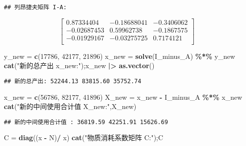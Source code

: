 \documentclass[
]{article}
\newenvironment{Shaded}{\begin{snugshade}}{\end{snugshade}}
\newcommand{\DecValTok}[1]{\textcolor[rgb]{0.00,0.00,0.81}{#1}}
\newcommand{\FunctionTok}[1]{\textcolor[rgb]{0.13,0.29,0.53}{\textbf{#1}}}
\newcommand{\NormalTok}[1]{#1}
\newcommand{\OtherTok}[1]{\textcolor[rgb]{0.56,0.35,0.01}{#1}}
\newcommand{\SpecialCharTok}[1]{\textcolor[rgb]{0.81,0.36,0.00}{\textbf{#1}}}
\newcommand{\StringTok}[1]{\textcolor[rgb]{0.31,0.60,0.02}{#1}}
\begin{document}
\begin{verbatim}
## 列昂捷夫矩阵 I-A:
\end{verbatim}

$$\begin{bmatrix}
0.87334404 & -0.18688041 & -0.3406062 \\
-0.02687453 & 0.59962738 & -0.1867575 \\
-0.01929167 & -0.03275725 & 0.7174121 \\
\end{bmatrix}$$

\begin{Shaded}
\begin{Highlighting}[]
\NormalTok{y\_new }\OtherTok{=} \FunctionTok{c}\NormalTok{(}\DecValTok{17786}\NormalTok{, }\DecValTok{42177}\NormalTok{, }\DecValTok{21896}\NormalTok{)}
\NormalTok{x\_new }\OtherTok{=} \FunctionTok{solve}\NormalTok{(I\_minus\_A) }\SpecialCharTok{\%*\%}\NormalTok{ y\_new}
\FunctionTok{cat}\NormalTok{(}\StringTok{"新的总产出 x\_new:"}\NormalTok{);x\_new }\SpecialCharTok{|\textgreater{}} \FunctionTok{as.vector}\NormalTok{()}
\end{Highlighting}
\end{Shaded}

\begin{verbatim}
## 新的总产出: 52244.13 83815.60 35752.74
\end{verbatim}

\begin{Shaded}
\begin{Highlighting}[]
\NormalTok{x\_new }\OtherTok{=} \FunctionTok{c}\NormalTok{(}\DecValTok{56786}\NormalTok{, }\DecValTok{82177}\NormalTok{, }\DecValTok{41896}\NormalTok{)}
\NormalTok{X\_new }\OtherTok{=}\NormalTok{ x\_new }\SpecialCharTok{{-}}\NormalTok{ I\_minus\_A }\SpecialCharTok{\%*\%}\NormalTok{ x\_new}
\FunctionTok{cat}\NormalTok{(}\StringTok{"新的中间使用合计值 X\_new:"}\NormalTok{,X\_new)}
\end{Highlighting}
\end{Shaded}

\begin{verbatim}
## 新的中间使用合计值 : 36819.59 42251.91 15626.69
\end{verbatim}

\begin{Shaded}
\begin{Highlighting}[]
\NormalTok{C }\OtherTok{=} \FunctionTok{diag}\NormalTok{((x }\SpecialCharTok{{-}}\NormalTok{ N)}\SpecialCharTok{/}\NormalTok{ x)}
\FunctionTok{cat}\NormalTok{(}\StringTok{"物质消耗系数矩阵 C:"}\NormalTok{);C}
\end{Highlighting}
\end{Shaded}
\end{document}
